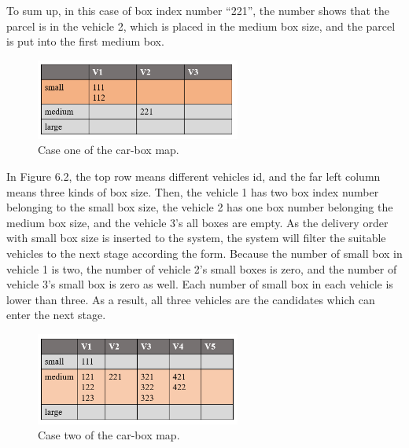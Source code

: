 \documentclass[12pt]{ksthesis}
\begin{document}
\begin{thesis}
{\begin{itemize}
\end{itemize}

To sum up, in this case of box index number “221”, the number shows that the parcel is in the vehicle 2, which is placed in the medium box size, and the parcel is put into the first medium box.

\begin{figure}[t]
\centering
\includegraphics[width=0.6\textwidth]{./Thesis_figures/F6-2_caseOne_boxFiltering.PNG}
\caption{\large Case one of the car-box map.}
\vspace{0.5cm}
\label{Fig:CaseOne_carBox_Map}
\end{figure}

In Figure 6.2, the top row means different vehicles id, and the far left column means three kinds of box size. Then, the vehicle 1 has two box index number belonging to the small box size, the vehicle 2 has one box number belonging the medium box size, and the vehicle 3’s all boxes are empty.
As the delivery order with small box size is inserted to the system, the system will filter the suitable vehicles to the next stage according the form. Because the number of small box in vehicle 1 is two, the number of vehicle 2’s small boxes is zero, and the number of vehicle 3’s small box is zero as well. Each number of small box in each vehicle is lower than three. As a result, all three vehicles are the candidates which can enter the next stage.

\begin{figure}[t]
\centering
\includegraphics[width=0.6\textwidth]{./Thesis_figures/F6-3_caseTwo_boxFiltering.PNG}
\caption{\large Case two of the car-box map.}
\vspace{0.5cm}
\label{Fig:CaseTwo_carBox_Map}
\end{figure}

}
\end{thesis}
\end{document}
